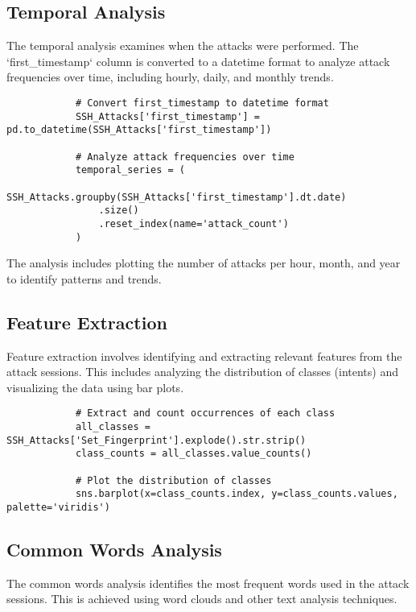     \subsection{Temporal Analysis}
    
        The temporal analysis examines when the attacks were performed. The `first_timestamp` column is converted to a datetime format to analyze attack frequencies over time, including hourly, daily, and monthly trends.

        \begin{verbatim}
            # Convert first_timestamp to datetime format
            SSH_Attacks['first_timestamp'] = pd.to_datetime(SSH_Attacks['first_timestamp'])

            # Analyze attack frequencies over time
            temporal_series = (
                SSH_Attacks.groupby(SSH_Attacks['first_timestamp'].dt.date)
                .size()
                .reset_index(name='attack_count')
            )
        \end{verbatim}

        The analysis includes plotting the number of attacks per hour, month, and year to identify patterns and trends.

    \subsection{Feature Extraction}
    
        Feature extraction involves identifying and extracting relevant features from the attack sessions. This includes analyzing the distribution of classes (intents) and visualizing the data using bar plots.

        \begin{verbatim}
            # Extract and count occurrences of each class
            all_classes = SSH_Attacks['Set_Fingerprint'].explode().str.strip()
            class_counts = all_classes.value_counts()

            # Plot the distribution of classes
            sns.barplot(x=class_counts.index, y=class_counts.values, palette='viridis')
        \end{verbatim}

    \subsection{Common Words Analysis}
    
        The common words analysis identifies the most frequent words used in the attack sessions. This is achieved using word clouds and other text analysis techniques.

